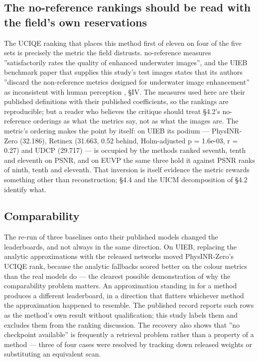 \documentclass[journal]{IEEEtran}
\begin{document}
\subsection{The no-reference rankings should be read with the field's own reservations}
The UCIQE ranking that places this method first of eleven on four of the five sets is precisely the metric the field distrusts. no-reference measures ''satisfactorily rates the quality of enhanced underwater images'', and the UIEB benchmark paper that supplies this study's test images states that its authors ''discard the non-reference metrics designed for underwater image enhancement'' as inconsistent with human perception \cite{li2020uieb} , \S{}IV. The measures used here are their published definitions with their published coefficients, so the rankings are reproducible; but a reader who believes the critique should treat \S{}4.2's no-reference orderings as what the metrics say, not as what the images are. The metric's ordering makes the point by itself: on UIEB its podium --- PhysINR-Zero (32.186), Retinex (31.663, 0.52 behind, Holm-adjusted p = 1.6e-03, r = 0.27) and UDCP (29.717) --- is occupied by the methods ranked seventh, tenth and eleventh on PSNR, and on EUVP the same three hold it against PSNR ranks of ninth, tenth and eleventh. That inversion is itself evidence the metric rewards something other than reconstruction; \S{}4.4 and the UICM decomposition of \S{}4.2 identify what.

\subsection{Comparability}
The re-run of three baselines onto their published models changed the leaderboards, and not always in the same direction. On UIEB, replacing the analytic approximations with the released networks moved PhysINR-Zero's UCIQE rank, because the analytic fallbacks scored better on the colour metrics than the real models do --- the clearest possible demonstration of why the comparability problem matters. An approximation standing in for a method produces a different leaderboard, in a direction that flatters whichever method the approximation happened to resemble. The published record reports such rows as the method's own result without qualification; this study labels them and excludes them from the ranking discussion. The recovery also shows that ''no checkpoint available'' is frequently a retrieval problem rather than a property of a method --- three of four cases were resolved by tracking down released weights or substituting an equivalent scan.
\end{document}
